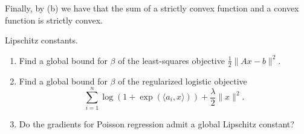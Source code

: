 \documentclass[10pt]{article}
\begin{document}
\begin{solution}[Solution]
\begin{enumerate}[label=(\alph*)]
\begin{enumerate}[label=(\roman*)]
                Finally, by (b) we have that the sum of a strictly convex function and a convex function is strictly convex.




        \end{enumerate}
        
\end{enumerate}
\end{solution}


\begin{problem}[Problem 4]
Lipschitz constants.  
\begin{enumerate}[label=(\alph*)]
\item Find a global bound for \( \beta \) of the least-squares objective \( \frac{1}{2}\|Ax-b\|^2 \).
\item Find a global bound for \( \beta \) of the regularized logistic objective 
\[
\sum_{i=1}^n \log(1+\exp(\langle a_i, x\rangle)) + \frac{\lambda}{2}\|x\|^2. 
\]
\item Do the gradients for Poisson regression admit a global Lipschitz constant? 
\end{enumerate}
\end{problem}
\end{document}
